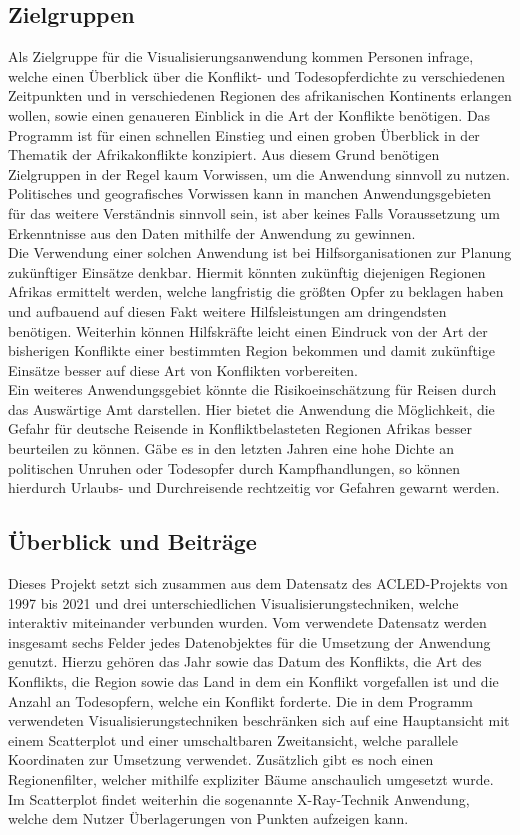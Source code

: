 \documentclass[usegeometry=true]{scrartcl}
\begin{document}
\subsection{Zielgruppen}
Als Zielgruppe für die Visualisierungsanwendung kommen Personen infrage, welche einen Überblick über die Konflikt- und Todesopferdichte zu verschiedenen Zeitpunkten und in verschiedenen Regionen des afrikanischen Kontinents erlangen wollen, sowie einen genaueren Einblick in die Art der Konflikte benötigen. Das Programm ist für einen schnellen Einstieg und einen groben Überblick in der Thematik der Afrikakonflikte konzipiert. Aus diesem Grund benötigen Zielgruppen in der Regel kaum Vorwissen, um die Anwendung sinnvoll zu nutzen. Politisches und geografisches Vorwissen kann in manchen Anwendungsgebieten für das weitere Verständnis sinnvoll sein, ist aber keines Falls Voraussetzung um Erkenntnisse aus den Daten mithilfe der Anwendung zu gewinnen.\\

Die Verwendung einer solchen Anwendung ist bei Hilfsorganisationen zur Planung zukünftiger Einsätze denkbar. Hiermit könnten zukünftig diejenigen Regionen Afrikas ermittelt werden, welche langfristig die größten Opfer zu beklagen haben und aufbauend auf diesen Fakt weitere Hilfsleistungen am dringendsten benötigen. Weiterhin können Hilfskräfte leicht einen Eindruck von der Art der bisherigen Konflikte einer bestimmten Region bekommen und damit zukünftige Einsätze besser auf diese Art von Konflikten vorbereiten.\\

Ein weiteres Anwendungsgebiet könnte die Risikoeinschätzung für Reisen durch das Auswärtige Amt \cite{aa} darstellen. Hier bietet die Anwendung die Möglichkeit, die Gefahr für deutsche Reisende in Konfliktbelasteten Regionen Afrikas besser beurteilen zu können. Gäbe es in den letzten Jahren eine hohe Dichte an politischen Unruhen oder Todesopfer durch Kampfhandlungen, so können hierdurch Urlaubs- und Durchreisende rechtzeitig vor Gefahren gewarnt werden.

\subsection{Überblick und Beiträge}
Dieses Projekt setzt sich zusammen aus dem Datensatz des ACLED-Projekts von 1997 bis 2021 und drei unterschiedlichen Visualisierungstechniken, welche interaktiv miteinander verbunden wurden. Vom verwendete Datensatz werden insgesamt sechs Felder jedes Datenobjektes für die Umsetzung der Anwendung genutzt. Hierzu gehören das Jahr sowie das Datum des Konflikts, die Art des Konflikts, die Region sowie das Land in dem ein Konflikt vorgefallen ist und die Anzahl an Todesopfern, welche ein Konflikt forderte. Die in dem Programm verwendeten Visualisierungstechniken beschränken sich auf eine Hauptansicht mit einem Scatterplot und einer umschaltbaren Zweitansicht, welche parallele Koordinaten zur Umsetzung verwendet. Zusätzlich gibt es noch einen Regionenfilter, welcher mithilfe expliziter Bäume anschaulich umgesetzt wurde. Im Scatterplot findet weiterhin die sogenannte X-Ray-Technik Anwendung, welche dem Nutzer Überlagerungen von Punkten aufzeigen kann. \\
\end{document}
